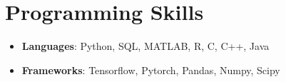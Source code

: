 \documentclass[letterpaper,12pt]{article}
\newcommand{\resumeItem}[2]{
  \item\small{
    \textbf{#1}{: #2 \vspace{-2pt}}
  }
}
\newcommand{\resumeSubItem}[2]{\resumeItem{#1}{#2}\vspace{-4pt}}
\newcommand{\resumeSubHeadingListStart}{\begin{itemize}[leftmargin=*, label={}]}
\newcommand{\resumeSubHeadingListEnd}{\end{itemize}}
\begin{document}

%
\section{Programming Skills}
\resumeSubHeadingListStart

\resumeSubItem{Languages}{Python, SQL, MATLAB, R, C, C++, Java}

\resumeSubItem{Frameworks}{Tensorflow, Pytorch, Pandas, Numpy, Scipy}

\resumeSubHeadingListEnd




\end{document}
